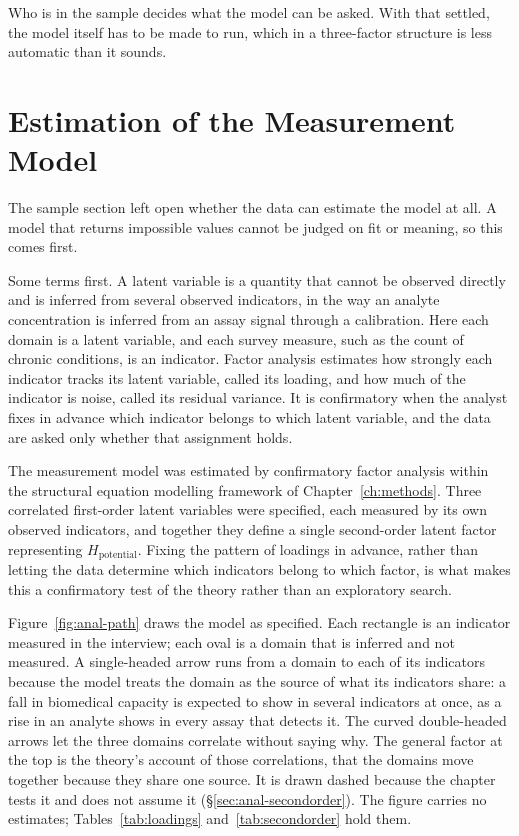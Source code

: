 Who is in the sample decides what the model can be asked. With that settled, the model itself has to be made to run, which in a three-factor structure is less automatic than it sounds.

\section{Estimation of the Measurement Model}
\label{sec:anal-estimation}
The sample section left open whether the data can estimate the model at all. A model that returns impossible values cannot be judged on fit or meaning, so this comes first.

Some terms first. A latent variable is a quantity that cannot be observed directly and is inferred from several observed indicators, in the way an analyte concentration is inferred from an assay signal through a calibration. Here each domain is a latent variable, and each survey measure, such as the count of chronic conditions, is an indicator. Factor analysis estimates how strongly each indicator tracks its latent variable, called its loading, and how much of the indicator is noise, called its residual variance. It is confirmatory when the analyst fixes in advance which indicator belongs to which latent variable, and the data are asked only whether that assignment holds.

The measurement model was estimated by confirmatory factor analysis within the structural equation modelling framework of Chapter~\ref{ch:methods}. Three correlated first-order latent variables were specified, each measured by its own observed indicators, and together they define a single second-order latent factor representing $H_{\text{potential}}$. Fixing the pattern of loadings in advance, rather than letting the data determine which indicators belong to which factor, is what makes this a confirmatory test of the theory rather than an exploratory search.

Figure~\ref{fig:anal-path} draws the model as specified. Each rectangle is an indicator measured in the interview; each oval is a domain that is inferred and not measured. A single-headed arrow runs from a domain to each of its indicators because the model treats the domain as the source of what its indicators share: a fall in biomedical capacity is expected to show in several indicators at once, as a rise in an analyte shows in every assay that detects it. The curved double-headed arrows let the three domains correlate without saying why. The general factor at the top is the theory's account of those correlations, that the domains move together because they share one source. It is drawn dashed because the chapter tests it and does not assume it (\S\ref{sec:anal-secondorder}). The figure carries no estimates; Tables~\ref{tab:loadings} and~\ref{tab:secondorder} hold them.


